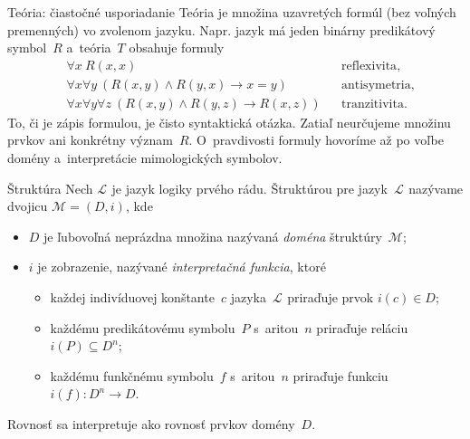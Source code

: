 \documentclass[12pt]{beamer}
\newcommand{\limpl}{\rightarrow}
\newcommand{\Lang}[1][]{\mathcal{L}_{\text{#1}}}
\begin{document}
\begin{frame}{Teória: čiastočné usporiadanie}
  \alert{Teória} je množina uzavretých formúl (bez voľných premenných) vo zvolenom jazyku.
  Napr. jazyk má jeden binárny predikátový symbol~$R$ a~teória~$T$ obsahuje formuly
  \begin{align*}
    &\forall x\ R(x,x)
      &&\text{reflexivita},\\
    &\forall x\forall y\ (R(x,y)\land R(y,x)\limpl x=y)
      &&\text{antisymetria},\\
    &\forall x\forall y\forall z\
      (R(x,y)\land R(y,z)\limpl R(x,z))
      &&\text{tranzitivita}.
  \end{align*}
  To, či je zápis formulou, je čisto syntaktická otázka.
  Zatiaľ neurčujeme množinu prvkov ani konkrétny význam~$R$.
  O~pravdivosti formuly hovoríme až po voľbe domény
  a~interpretácie mimologických symbolov.
\end{frame}

\begin{frame}{Štruktúra}
  Nech $\Lang$ je jazyk logiky prvého rádu.
  \alert{Štruktúrou} pre jazyk~$\Lang$
  nazývame dvojicu $\mathcal M=(D,i)$, kde
  \begin{itemize}
    \item $D$ je ľubovoľná \alert{neprázdna} množina
      nazývaná \emph{doména} štruktúry~$\mathcal M$;
    \item $i$ je zobrazenie, nazývané \emph{interpretačná funkcia}, ktoré
      \begin{itemize}
        \item každej indivíduovej konštante~$c$ jazyka~$\Lang$
          priraďuje prvok $i(c)\in D$;
        \item každému predikátovému symbolu~$P$ s~aritou~$n$
          priraďuje reláciu $i(P)\subseteq D^n$;
        \item každému funkčnému symbolu~$f$ s~aritou~$n$
          priraďuje funkciu $i(f)\colon D^n\to D$.
      \end{itemize}
  \end{itemize}
  Rovnosť sa interpretuje ako rovnosť prvkov domény~$D$.
\end{frame}
\end{document}
